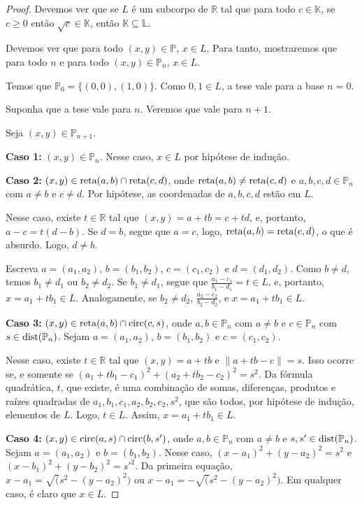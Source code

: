 \begin{proof}
    Devemos ver que se $L$ é um subcorpo de $\mathbb R$ tal que para todo $c \in \mathbb K$, se $c\geq 0$ então $\sqrt c \in \mathbb K$, então $\mathbb K\subseteq \mathbb L$.

    Devemos ver que para todo $(x, y)\in \mathbb P$, $x \in L$. Para tanto, mostraremos que para todo $n$ e para todo $(x, y)\in \mathbb P_n$, $x \in L$.

    Temos que $\mathbb P_0=\{(0, 0), (1, 0)\}$. Como $0, 1 \in L$, a tese vale para a base $n=0$.

    Suponha que a tese vale para $n$. Veremos que vale para $n+1$.

    Seja $(x, y) \in \mathbb P_{n+1}$.

    \textbf{Caso 1:} $(x, y)\in \mathbb P_n$. Nesse caso, $x \in L$ por hipótese de indução.

    \textbf{Caso 2:} $(x, y)\in \operatorname{reta}(a, b)\cap \operatorname{reta}(c, d)$, onde $\operatorname{reta}(a, b)\neq \operatorname{reta}(c, d)$ e $a, b, c, d \in \mathbb P_n$ com $a\neq b$ e $c\neq d$. Por hipótese, as coordenadas de $a, b, c, d$ estão em $L$.

    Nesse caso, existe $t \in \mathbb R$ tal que $(x, y)=a+tb=c+td$, e, portanto, $a-c=t(d-b)$. Se $d=b$, segue que $a=c$, logo, $\operatorname{reta}(a, b)= \operatorname{reta}(c, d)$, o que é absurdo. Logo, $d\neq b$.

    Escreva $a=(a_1, a_2)$, $b=(b_1, b_2)$, $c=(c_1, c_2)$ e $d=(d_1, d_2)$. Como $b\neq d$, temos $b_1\neq d_1$ ou $b_2\neq d_2$. Se $b_1\neq d_1$, segue que $\frac{a_1-c_1}{b_1-d_1}=t\in L$, e, portanto, $x=a_1+tb_1\in L$. Analogamente, se $b_2\neq d_2$, $\frac{a_2-c_2}{b_2-d_2}$, e $x=a_1+tb_1\in L$.

    \textbf{Caso 3:} $(x, y)\in \operatorname{reta}(a, b)\cap \operatorname{circ}(c, s)$, onde $a, b \in \mathbb P_n$ com $a\neq b$ e $c \in \mathbb P_n$ com $s \in \operatorname{dist}(\mathbb P_n)$. Sejam $a=(a_1, a_2)$, $b=(b_1, b_2)$ e $c=(c_1, c_2)$.

    Nesse caso, existe $t \in \mathbb R$ tal que $(x, y)=a+tb$ e $\|a+tb-c\|=s$. Isso ocorre se, e somente se $(a_1+tb_1-c_1)^2+(a_2+tb_2-c_2)^2=s^2$.
    Da fórmula quadrática, $t$, que existe, é uma combinação de somas, diferenças, produtos e raízes quadradas de $a_1, b_1, c_1, a_2, b_2, c_2, s^2$, que são todos, por hipótese de indução, elementos de $L$. Logo, $t \in L$. Assim, $x=a_1+tb_1\in L$.

    \textbf{Caso 4:} $(x, y)\in \operatorname{circ}(a, s)\cap \operatorname{circ}(b, s')$, onde $a, b \in \mathbb P_n$ com $a\neq b$ e $s, s' \in \operatorname{dist}(\mathbb P_n)$. Sejam $a=(a_1, a_2)$ e $b=(b_1, b_2)$.
    Nesse caso, $(x-a_1)^2+(y-a_2)^2=s^2$ e $(x-b_1)^2+(y-b_2)^2=s'^2$. Da primeira equação, $x-a_1=\sqrt(s^2-(y-a_2)^2)$ ou $x-a_1=-\sqrt(s^2-(y-a_2)^2)$. Em qualquer caso, é claro que $x \in L$.
\end{proof}


